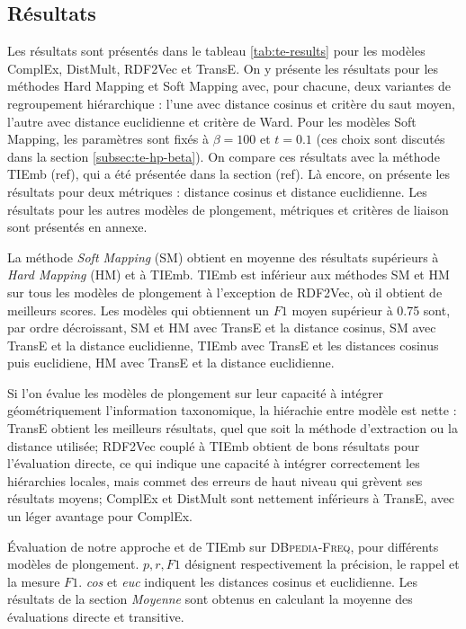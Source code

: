 \subsection{Résultats}
\label{subsec:te-results}

Les résultats sont présentés dans le tableau \ref{tab:te-results} pour les modèles ComplEx, DistMult, RDF2Vec et TransE. On y présente les résultats pour les méthodes Hard Mapping et Soft Mapping avec, pour chacune, deux variantes de regroupement hiérarchique : l'une avec distance cosinus et critère du saut moyen, l'autre avec distance euclidienne et critère de Ward. Pour les modèles Soft Mapping, les paramètres sont fixés à $\beta = 100$ et $t=0.1$ (ces choix sont discutés dans la section \ref{subsec:te-hp-beta}). On compare ces résultats avec la méthode TIEmb (ref), qui a été présentée dans la section (ref). Là encore, on présente les résultats pour deux métriques : distance cosinus et distance euclidienne. Les résultats pour les autres modèles de plongement, métriques et critères de liaison sont présentés en annexe.

La méthode \textit{Soft Mapping} (SM) obtient en moyenne des résultats supérieurs à \textit{Hard Mapping} (HM) et à TIEmb. TIEmb est inférieur aux méthodes SM et HM sur tous les modèles de plongement à l'exception de RDF2Vec, où il obtient de meilleurs scores. Les modèles qui obtiennent un $F1$ moyen supérieur à 0.75 sont, par ordre décroissant, SM et HM avec TransE et la distance cosinus, SM avec TransE et la distance euclidienne, TIEmb avec TransE et les distances cosinus puis euclidiene, HM avec TransE et la distance euclidienne. 


Si l'on évalue les modèles de plongement sur leur capacité à intégrer géométriquement l'information taxonomique, la hiérachie entre modèle est nette : TransE obtient les meilleurs résultats, quel que soit la méthode d'extraction ou la distance utilisée; RDF2Vec couplé à TIEmb obtient de bons résultats pour l'évaluation directe, ce qui indique une capacité à intégrer correctement les hiérarchies locales, mais commet des erreurs de haut niveau qui grèvent ses résultats moyens; ComplEx et DistMult sont nettement inférieurs à TransE, avec un léger avantage pour ComplEx.


\begin{table}
    \centering
    \caption[Évaluation de trois méthodes d'extraction de taxonomie]{
    Évaluation de notre approche et de TIEmb sur \textsc{DBpedia-Freq}, pour différents modèles de plongement. $p, r, F1$ désignent respectivement la précision, le rappel et la mesure $F1$. \textit{cos} et \textit{euc} indiquent les distances cosinus et euclidienne. Les résultats de la section \textit{Moyenne} sont obtenus en calculant la moyenne des évaluations directe et transitive.}
    \begin{adjustwidth}{-1in}{-1in}
        \begin{center}
            
            \label{tab:te-results} 
        \end{center}
    \end{adjustwidth}
\end{table}


